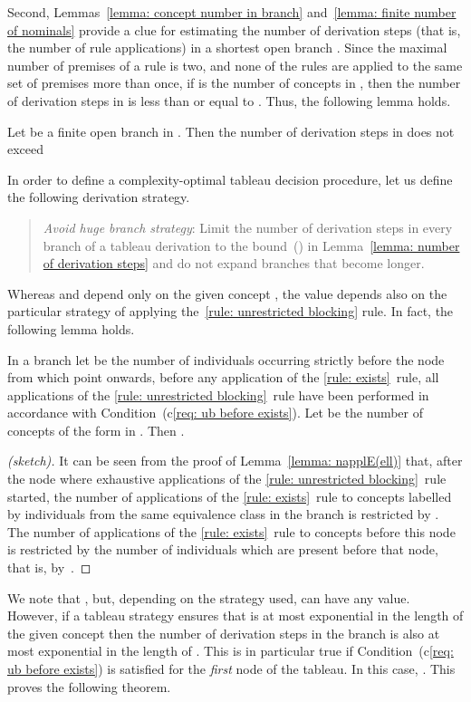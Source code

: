 \documentclass[leqno
,pdflatex
,prodmode
,acmtocl
]{acmsmall}
\begin{document}
Second, Lemmas~\ref{lemma: concept number in branch} and~\ref{lemma: finite number of nominals} provide
a clue for estimating the number of derivation steps (that is, the number of rule applications)
in a shortest open branch .
Since the maximal number of premises of a rule is two,
and none of the rules are applied to the same set of premises more than once,
if  is the number of concepts in , then the number of derivation steps in  is less than or equal to .
Thus, the following lemma holds.
\begin{lemma}\label{lemma: number of derivation steps}
Let  be a finite open branch
in .
Then the number of derivation steps in  does not exceed

\end{lemma}

In order to define a complexity-optimal tableau decision procedure, let
us define the following derivation strategy.
\begin{quote}
\emph{Avoid huge branch strategy}:
Limit the number of derivation steps in every branch 
of a tableau derivation to the bound~() in Lemma~\ref{lemma: number of derivation steps}
and do not expand branches that become longer.
\end{quote}

Whereas  and  depend only on the given concept , the value
 depends
also on the particular strategy of applying the~\eqref{rule:
unrestricted blocking} rule.
In fact, the following lemma holds.

\begin{lemma}
In a branch 
let  be the number of individuals occurring
strictly before the node from which point onwards, before any application of
the \eqref{rule: exists}~rule,
all applications of the \eqref{rule: unrestricted blocking}~rule
have been performed in accordance with 
Condition~(c\ref{req: ub before exists}).
Let  be the number of concepts of the form  in .
Then .
\end{lemma}

\begin{proof}[(sketch)]
It can be seen from the proof of Lemma~\ref{lemma: napplE(ell)}
that, after the node where exhaustive
applications of the \eqref{rule: unrestricted blocking}~rule started,
the number of applications of the \eqref{rule: exists}~rule
to concepts labelled by individuals from the same equivalence class
in the branch  
is restricted by .
The number of applications of the \eqref{rule: exists}~rule to concepts
before this node is restricted by the number of individuals which
are present before that node, that is, by~.
\end{proof}
We note that , but, depending on the strategy used,  can have any value. 
However, if a tableau strategy ensures that  is at most exponential
in the length of the given concept 
then the number of derivation steps in the branch 
is also at most exponential in the length of .
This is in particular true
if Condition~(c\ref{req: ub before exists})
is satisfied for the \emph{first} node of the tableau.
In this case, . 
This proves the following theorem.
\end{document}

